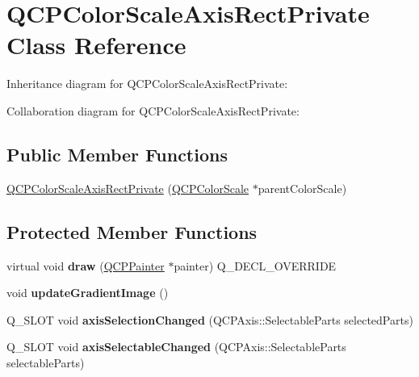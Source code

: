 \hypertarget{classQCPColorScaleAxisRectPrivate}{}\section{Q\+C\+P\+Color\+Scale\+Axis\+Rect\+Private Class Reference}
\label{classQCPColorScaleAxisRectPrivate}


Inheritance diagram for Q\+C\+P\+Color\+Scale\+Axis\+Rect\+Private\+:


Collaboration diagram for Q\+C\+P\+Color\+Scale\+Axis\+Rect\+Private\+:
\subsection*{Public Member Functions}
\begin{DoxyCompactItemize}
\item 
\hyperlink{classQCPColorScaleAxisRectPrivate_ad3b242f75dd2b33581364a4e668a80db}{Q\+C\+P\+Color\+Scale\+Axis\+Rect\+Private} (\hyperlink{classQCPColorScale}{Q\+C\+P\+Color\+Scale} $\ast$parent\+Color\+Scale)
\end{DoxyCompactItemize}
\subsection*{Protected Member Functions}
\begin{DoxyCompactItemize}
\item 
\mbox{\label{classQCPColorScaleAxisRectPrivate_a52a21c7cbe086cd587c955cfe6e25e3b}} 
virtual void {\bfseries draw} (\hyperlink{classQCPPainter}{Q\+C\+P\+Painter} $\ast$painter) Q\+\_\+\+D\+E\+C\+L\+\_\+\+O\+V\+E\+R\+R\+I\+DE
\item 
\mbox{\label{classQCPColorScaleAxisRectPrivate_a73754cab312aeaddea1bfcc67cc079ac}} 
void {\bfseries update\+Gradient\+Image} ()
\item 
\mbox{\label{classQCPColorScaleAxisRectPrivate_a6112ad4291ac1695d37659cb049d598d}} 
Q\+\_\+\+S\+L\+OT void {\bfseries axis\+Selection\+Changed} (Q\+C\+P\+Axis\+::\+Selectable\+Parts selected\+Parts)
\item 
\mbox{\label{classQCPColorScaleAxisRectPrivate_a66d2baed86966bb03a6d7c32dc7d59f7}} 
Q\+\_\+\+S\+L\+OT void {\bfseries axis\+Selectable\+Changed} (Q\+C\+P\+Axis\+::\+Selectable\+Parts selectable\+Parts)
\end{DoxyCompactItemize}
